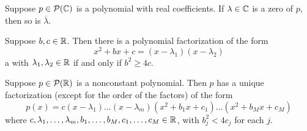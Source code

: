 \begin{theorem} 
    Suppose $p \in \mathcal{P}(\operatorname{\mathbb{C}})$ is a polynomial with real coefficients. If $\lambda \in \operatorname{\mathbb{C}}$
    is a zero of $p$, then so is $\overline{\lambda}$.
\end{theorem}

\begin{theorem} 
    Suppose $b, c \in \operatorname{\mathbb{R}}$. Then there is a polynomial factorization of the form
    \[ x^2 + bx + c = (x - \lambda_1)(x - \lambda_2) \]a
    with $\lambda_1, \lambda_2 \in \operatorname{\mathbb{R}}$ if and only if $b^2 \geq 4c$.
\end{theorem}

\begin{theorem} 
    Suppose $p \in \mathcal{P}(\operatorname{\mathbb{R}})$ is a nonconstant polynomial. Then $p$
    has a unique factorization (except for the order of the factors) of the form
    \[ p(x) = c(x - \lambda_1)\dots(x - \lambda_m)(x^2 + b_1 x + c_1)\dots(x^2 + b_M x + c_M) \]
    where $c, \lambda_1, \dots, \lambda_m, b_1, \dots, b_M, c_1, \dots, c_M \in \operatorname{\mathbb{R}}$, with $b_j^2 < 4c_j$ for each $j$.
\end{theorem}
\endinput